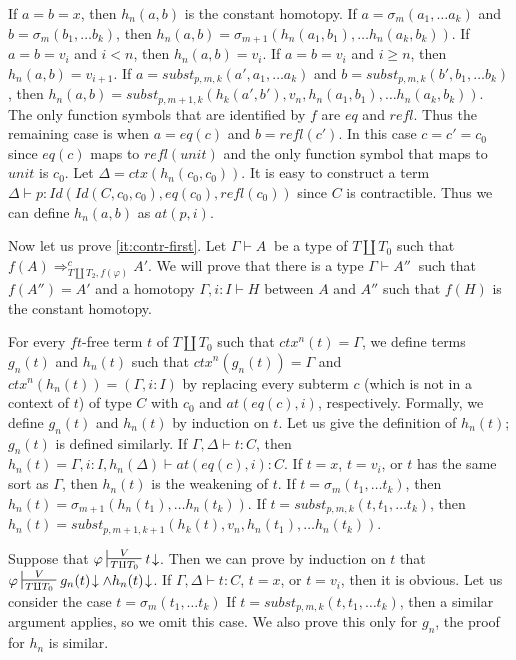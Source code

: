 \documentclass[reqno]{amsart}
\theoremstyle{definition}
\theoremstyle{remark}
\newcommand{\type}{}
\newcommand{\at}{\mathit{at}}
\newcommand{\unit}{\mathit{unit}}
\newcommand{\Ceq}{\mathit{eq}}
\newcommand{\Id}{\mathit{Id}}
\newcommand{\refl}{\mathit{refl}}
\newcommand{\subst}{\mathit{subst}}
\newcommand{\ft}{\mathit{ft}}
\newcommand{\ctx}{\mathit{ctx}}
\numberwithin{figure}{section}
\begin{document}
If $a = b = x$, then $h_n(a,b)$ is the constant homotopy.
If $a = \sigma_m(a_1, \ldots a_k)$ and $b = \sigma_m(b_1, \ldots b_k)$, then $h_n(a,b) = \sigma_{m+1}(h_n(a_1,b_1), \ldots h_n(a_k,b_k))$.
If $a = b = v_i$ and $i < n$, then $h_n(a,b) = v_i$.
If $a = b = v_i$ and $i \geq n$, then $h_n(a,b) = v_{i+1}$.
If $a = \subst_{p,m,k}(a', a_1, \ldots a_k)$ and $b = \subst_{p,m,k}(b', b_1, \ldots b_k)$, then $h_n(a,b) = \subst_{p,m+1,k}(h_k(a',b'), v_n, h_n(a_1,b_1), \ldots h_n(a_k,b_k))$.
The only function symbols that are identified by $f$ are $\Ceq$ and $\refl$.
Thus the remaining case is when $a = \Ceq(c)$ and $b = \refl(c')$.
In this case $c = c' = c_0$ since $\Ceq(c)$ maps to $\refl(\unit)$ and the only function symbol that maps to $\unit$ is $c_0$.
Let $\Delta = \ctx(h_n(c_0,c_0))$.
It is easy to construct a term $\Delta \vdash p : \Id(\Id(C,c_0,c_0),\Ceq(c_0),\refl(c_0))$ since $C$ is contractible.
Thus we can define $h_n(a,b)$ as $\at(p,i)$.

Now let us prove \eqref{it:contr-first}.
Let $\Gamma \vdash A\ \type$ be a type of $T \amalg T_0$ such that $f(A) \Rightarrow_{T \amalg T_2, f(\varphi)}^c A'$.
We will prove that there is a type $\Gamma \vdash A''\ \type$ such that $f(A'') = A'$ and a homotopy $\Gamma, i : I \vdash H \type$ between $A$ and $A''$ such that $f(H)$ is the constant homotopy.

For every $\ft$-free term $t$ of $T \amalg T_0$ such that $\ctx^n(t) = \Gamma$, we define terms $g_n(t)$ and $h_n(t)$ such that $\ctx^n(g_n(t)) = \Gamma$ and $\ctx^n(h_n(t)) = (\Gamma, i : I)$
by replacing every subterm $c$ (which is not in a context of $t$) of type $C$ with $c_0$ and $\at(\Ceq(c),i)$, respectively.
Formally, we define $g_n(t)$ and $h_n(t)$ by induction on $t$.
Let us give the definition of $h_n(t)$; $g_n(t)$ is defined similarly.
If $\Gamma, \Delta \vdash t : C$, then $h_n(t) = \Gamma, i : I, h_n(\Delta) \vdash \at(\Ceq(c),i) : C$.
If $t = x$, $t = v_i$, or $t$ has the same sort as $\Gamma$, then $h_n(t)$ is the weakening of $t$.
If $t = \sigma_m(t_1, \ldots t_k)$, then $h_n(t) = \sigma_{m+1}(h_n(t_1), \ldots h_n(t_k))$.
If $t = \subst_{p,m,k}(t, t_1, \ldots t_k)$, then $h_n(t) = \subst_{p,m+1,k+1}(h_k(t), v_n, h_n(t_1), \ldots h_n(t_k))$.

Suppose that $\varphi \sststile{T \amalg T_0}{V} t\!\downarrow$.
Then we can prove by induction on $t$ that $\varphi \sststile{T \amalg T_0}{V} g_n(t)\!\downarrow \land h_n(t)\!\downarrow$.
If $\Gamma, \Delta \vdash t : C$, $t = x$, or $t = v_i$, then it is obvious.
Let us consider the case $t = \sigma_m(t_1, \ldots t_k)$
If $t = \subst_{p,m,k}(t, t_1, \ldots t_k)$, then a similar argument applies, so we omit this case.
We also prove this only for $g_n$, the proof for $h_n$ is similar.
\end{document}

